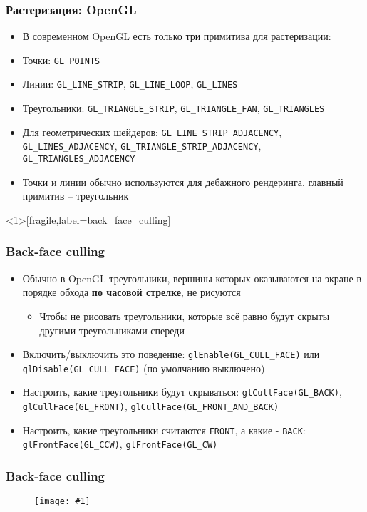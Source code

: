 \documentclass{beamer}
\newcommand{\slideimage}[1]{
  \begin{figure}
    \begin{adjustbox}{width=\textwidth, totalheight=\textheight-2\baselineskip-2\baselineskip,keepaspectratio}
      \texttt{[image: \#1]}
    \end{adjustbox}
  \end{figure}
}
\begin{document}
\begin{frame}[fragile]
\frametitle{Растеризация: OpenGL}
\begin{itemize}
\item В современном OpenGL есть только три примитива для растеризации:
\pause
\item Точки: \verb|GL_POINTS|
\pause
\item Линии: \verb|GL_LINE_STRIP|, \verb|GL_LINE_LOOP|, \verb|GL_LINES|
\pause
\item Треугольники: \verb|GL_TRIANGLE_STRIP|, \verb|GL_TRIANGLE_FAN|, \verb|GL_TRIANGLES|
\pause
\item Для геометрических шейдеров: \verb|GL_LINE_STRIP_ADJACENCY|, \verb|GL_LINES_ADJACENCY|, \verb|GL_TRIANGLE_STRIP_ADJACENCY|, \verb|GL_TRIANGLES_ADJACENCY|
\pause
\item Точки и линии обычно используются для дебажного рендеринга, главный примитив -- треугольник
\end{itemize}
\end{frame}

\begin{frame}<1>[fragile,label=back_face_culling]
\frametitle{Back-face culling}
\begin{itemize}
\item Обычно в OpenGL треугольники, вершины которых оказываются на экране в порядке обхода \textbf{по часовой стрелке}, {\color{red}не рисуются}
\pause
\begin{itemize}
\item Чтобы не рисовать треугольники, которые всё равно будут скрыты другими треугольниками спереди
\end{itemize}
\pause
\item Включить/выключить это поведение: \verb|glEnable(GL_CULL_FACE)| или \verb|glDisable(GL_CULL_FACE)| (по умолчанию выключено)
\pause
\item Настроить, какие треугольники будут скрываться: \verb|glCullFace(GL_BACK)|, \verb|glCullFace(GL_FRONT)|, \verb|glCullFace(GL_FRONT_AND_BACK)|
\pause
\item Настроить, какие треугольники считаются \verb|FRONT|, а какие - \verb|BACK|: \verb|glFrontFace(GL_CCW)|, \verb|glFrontFace(GL_CW)|
\end{itemize}
\end{frame}

\begin{frame}
\frametitle{Back-face culling}
\slideimage{back-face-culling.png}
\end{frame}
\end{document}
